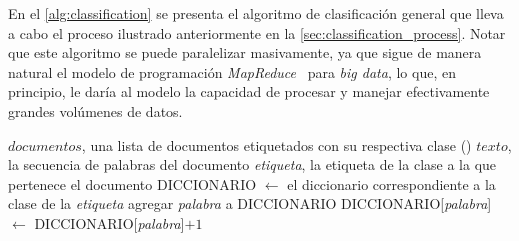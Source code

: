 En el \autoref{alg:classification} se presenta el algoritmo de clasificación general que lleva a cabo el proceso ilustrado anteriormente en la \autoref{sec:classification_process}.
Notar que este algoritmo se puede paralelizar masivamente, ya que sigue de manera natural el modelo de programación \emph{MapReduce}~\cite{dean2008} para \emph{big data}, lo que, en principio, le daría al modelo la capacidad de procesar y manejar efectivamente grandes volúmenes de datos.

\begin{algorithm}[t!]
\small
\caption{\small Algoritmo de entrenamiento de SS3, implementado aquí por el procedimiento , el cual puede volverse a ejecutar cuando nuevos documentos de entrenamiento se vuelvan disponibles.}
\label{alg:training}
\begin{algorithmic}
\Statex
{}
	\State \Input $documentos$, una lista de documentos etiquetados con su respectiva clase
	\State
		\State {}
	\EndFor
	\State
	\State {}() 
\EndProcedure
\Statex \hrulefill
{}
	\State \Input $texto$, la secuencia de palabras del documento
	\State {} \emph{etiqueta}, la etiqueta de la clase a la que pertenece el documento
	\State
	\State DICCIONARIO $\gets$ el diccionario correspondiente a la clase de la \emph{etiqueta}
			\State agregar \emph{palabra} a DICCIONARIO
		\EndIf
		\State DICCIONARIO[\emph{palabra}] $\gets$ DICCIONARIO[\emph{palabra}]$ + 1$
	\EndFor
\EndProcedure
\end{algorithmic}
\end{algorithm}

